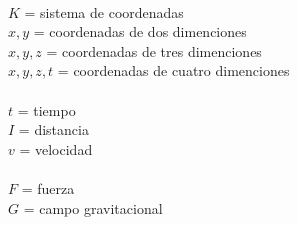 \documentclass[spanish]{book}
\begin{document}
\newpage{}

~\\
 $K$ = sistema de coordenadas \\
 $x,y$ = coordenadas de dos dimenciones \\
 $x,y,z$ = coordenadas de tres dimenciones \\
 $x,y,z,t$ = coordenadas de cuatro dimenciones \\


~\\
 $t$ = tiempo \\
 $I$ = distancia \\
 $v$ = velocidad \\


~\\
 $F$ = fuerza \\
 $G$ = campo gravitacional 
\end{document}
